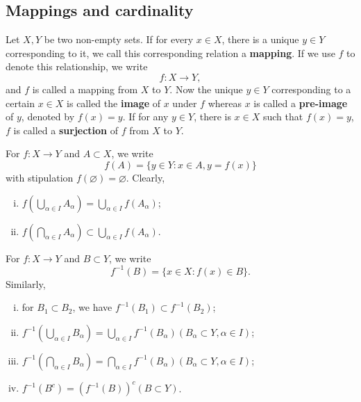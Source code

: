 \documentclass[11pt,singlecolumn, openany, citestyle=authoryear]{elegantbook}
\begin{document}
\begin{CJK}{UTF8}{gbsn}
    \section{Mappings and cardinality}
    \begin{definition}
        Let $X,Y$ be two non-empty sets. If for every $x \in X$, there is a unique $y \in Y$
        corresponding to it, we call this corresponding relation a \textbf{mapping}.
        If we use $f$ to denote this relationship, we write 
        $$
        f:X \to Y,
        $$ 
        and $f$ is called a mapping from $X$ to $Y$. Now the unique $y \in Y$ corresponding to 
        a certain $x \in X$ is called the \textbf{image} of $x$ under $f$ whereas $x$ is called
        a \textbf{pre-image} of $y$, denoted by $f(x)=y$. 
        If for any $y \in Y$, there is $x \in X$ such that $f(x)=y$, $f$ is called a \textbf{surjection}
        of $f$ from $X$ to $Y$.
    \end{definition}
    
    For $f:X \to Y$ and $A \subset X$, we write 
    $$
    f(A)=\{y \in Y:x \in A,y=f(x)\}
    $$
    with stipulation $f(\varnothing) = \varnothing$.
    Clearly, 
    \begin{enumerate}[(i)]
        \item $\displaystyle f \left(
        \bigcup_{\alpha \in I}A_\alpha    
        \right)=\bigcup_{\alpha \in I}f(A_\alpha)$;
        \item $\displaystyle f\left(
            \bigcap_{\alpha \in I}A_\alpha    
            \right)\subset \bigcup_{\alpha \in I}f(A_\alpha)$.
    \end{enumerate}
    
    For $f:X \to Y$ and $B \subset Y$, we write 
    $$
    f^{-1}(B) = \{x \in X: f(x) \in B\}.
    $$
    Similarly,
    \begin{enumerate}[(i)]
        \item for $B_1 \subset B_2$, we have $f^{-1}(B_1)\subset f^{-1}(B_2)$;
        \item $\displaystyle 
        f^{-1}\left(
        \bigcup_{\alpha \in I}B_\alpha    
        \right)=\bigcup_{\alpha \in I}f^{-1}(B_\alpha)
        (B_\alpha \subset Y, \alpha \in I)
        $;
        \item $\displaystyle 
        f^{-1}\left(
        \bigcap_{\alpha \in I}B_\alpha    
        \right)=\bigcap_{\alpha \in I}f^{-1}(B_\alpha)
        (B_\alpha \subset Y, \alpha \in I)
        $;
        \item $\displaystyle 
        f^{-1}(B^c) = (f^{-1}(B))^c
        (B \subset Y)
        $.
    \end{enumerate}
    

\end{CJK}
\end{document}
